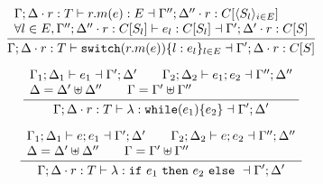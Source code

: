 \documentclass[a4paper]{llncs}
\newcommand{\nul}{\ensuremath{\mathtt{null}}\xspace}
\newcommand{\switch}[2]{\ensuremath{\mathtt{switch}(#1)\set{#2}}}
\newcommand{\while}[2]{\ensuremath{\mathtt{while}(#1)\set{#2}}}
\begin{document}
\[\begin{array}{c}
		\tree {
			\begin{array}{l}
				\Gamma; \Delta \cat r : T \proves r.m(e) : E \dashv \Gamma''; \Delta'' \cat r: C[\lrangle{S_l}_{i \in E}] \\
				\forall l \in E, \Gamma''; \Delta'' \cat r: C[S_l] \proves e_l: C[S_l] \dashv \Gamma'; \Delta' \cat r: C[S]
			\end{array}
		}{
			\Gamma; \Delta \cat r: T \proves \switch{r.m(e)}{l: e_l}_{l \in E} \dashv \Gamma'; \Delta \cat r: C[S]
		}
		\\[6mm]

		\tree {
			\begin{array}{l}
				\Gamma_1; \Delta_1 \proves e_1 \dashv \Gamma'; \Delta'
				\qquad 
				\Gamma_2; \Delta_2 \proves e_1;e_2 \dashv \Gamma''; \Delta''
				\\
				\Delta = \Delta' \uplus \Delta'' \qquad
				\Gamma = \Gamma' \uplus \Gamma''
			\end{array}
		}{
			\Gamma; \Delta \cat r: T \proves \lambda: \while{e_1}{e_2} \dashv \Gamma'; \Delta'
		}
		\\[6mm]

		\tree {
			\begin{array}{l}
				\Gamma_1; \Delta_1 \proves e; e_1 \dashv \Gamma'; \Delta'
				\qquad 
				\Gamma_2; \Delta_2 \proves e;e_2 \dashv \Gamma''; \Delta''
				\\
				\Delta = \Delta' \uplus \Delta'' \qquad
				\Gamma = \Gamma' \uplus \Gamma''
			\end{array}
		}{
			\Gamma; \Delta \cat r: T \proves \lambda: \ifthenelse{e_1}{e_2} \dashv \Gamma'; \Delta'
		}
	\end{array}
\]


%



%
\end{document}

